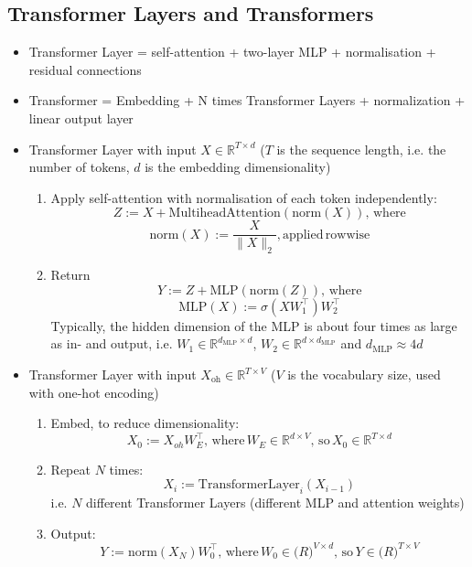 \documentclass{article}
\begin{document}
\subsection*{Transformer Layers and Transformers}
\begin{itemize}
    \item Transformer Layer = self-attention + two-layer MLP + normalisation + residual connections
    \item Transformer = Embedding + N times Transformer Layers + normalization + linear output layer
    \item Transformer Layer with input $X \in \mathbb{R}^{T\times d}$
    ($T$ is the sequence length, i.e. the number of tokens, $d$ is the embedding dimensionality)
    \begin{enumerate}
        \item Apply self-attention with normalisation of each token independently:
        $$Z := X + \mathrm{MultiheadAttention}(\mathrm{norm}(X))\mathrm{,\, where}$$
        $$\mathrm{norm}(X) := \frac{X}{\|X\|_2}, \mathrm{applied\, rowwise}$$
        
        \item Return
        $$Y := Z + \mathrm{MLP}(\mathrm{norm}(Z))\mathrm{,\, where}$$
        $$\mathrm{MLP}(X) := \sigma(XW_1^\intercal)W_2^\intercal$$
        Typically, the hidden dimension of the MLP is about four times as large as in- and output, i.e.
        $W_1\in\mathbb{R}^{d_\mathrm{MLP}\times d}$, $W_2\in\mathbb{R}^{d\times d_\mathrm{MLP}}$ and $d_\mathrm{MLP}\approx 4d$
    \end{enumerate}
    \item Transformer Layer with input $X_\mathrm{oh} \in \mathbb{R}^{T\times V}$
    ($V$ is the vocabulary size, used with one-hot encoding)
    \begin{enumerate}
        \item Embed, to reduce dimensionality:
        $$X_0 := X_{oh}W_E^\intercal \mathrm{,\,where\,} W_E\in\mathbb{R}^{d\times V} \mathrm{,\,so\,} X_0\in\mathbb{R}^{T\times d}$$

        \item Repeat $N$ times:
        $$X_i:=\mathrm{TransformerLayer}_i(X_{i-1})$$
        i.e. $N$ different Transformer Layers (different MLP and attention weights)

        \item Output:
        $$Y:=\mathrm{norm}(X_N)W_0^\intercal \mathrm{,\,where\,} W_0\in\mathbb(R)^{V\times d} \mathrm{,\,so\,} Y\in\mathbb(R)^{T\times V}$$
    \end{enumerate}
\end{itemize}
\end{document}
